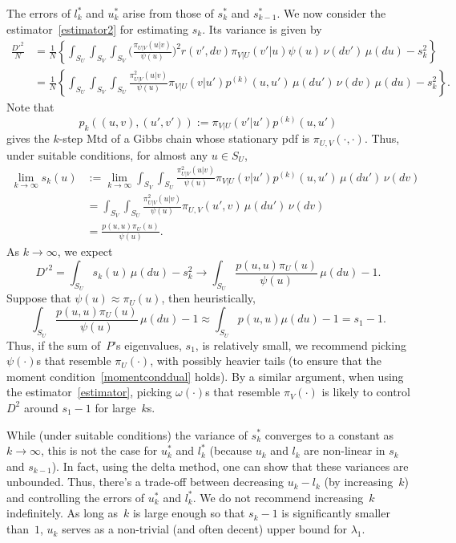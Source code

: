 \documentclass[11pt]{article}
\begin{document}
	The errors of $l^*_k$ and $u^*_k$ arise from those of $s^*_k$ and $s^*_{k-1}$. We now consider the estimator~\eqref{estimator2} for estimating $s_k$. Its variance is given by
	\[
	\begin{aligned}
	\frac{D'^2}{N} &= \frac{1}{N} \left\{ \int_{S_U}\int_{S_V}\int_{S_V} \bigg(\frac{\pi_{U|V}(u|v)}{\psi(u)}\bigg)^2
	r(v',dv) \pi_{V|U}(v'|u) \psi(u) \,\nu(dv') \, \mu(du) - s_k^2 \right\}\\
	&= \frac{1}{N} \left\{ \int_{S_U}\int_{S_V} \int_{S_U} \frac{\pi_{U|V}^2(u|v)}{\psi(u)} \pi_{V|U}(v|u') p^{(k)}(u,u') \, \mu(du') \, \nu(dv) \, \mu(du) - s_k^2 \right\}.
	\end{aligned}
	\]
	Note that
	\[
	p_k\left( (u,v), (u',v') \right) := \pi_{V|U}(v'|u') p^{(k)}(u,u')
	\]
	gives the $k$-step Mtd of a Gibbs chain whose stationary pdf is $\pi_{U,V}(\cdot,\cdot)$. Thus, under suitable conditions, for almost any $u \in S_U$,
	\[
	\begin{aligned}
	\lim\limits_{k \to \infty} s_k(u) &:= \lim\limits_{k \to \infty} \int_{S_V} \int_{S_U} \frac{\pi_{U|V}^2(u|v)}{\psi(u)} \pi_{V|U}(v|u') p^{(k)}(u,u') \, \mu(du') \, \nu(dv) \\
	&= \int_{S_V} \int_{S_U} \frac{\pi_{U|V}^2(u|v)}{\psi(u)} \pi_{U,V}(u',v) \, \mu(du') \, \nu(dv) \\
	&= \frac{p(u,u) \pi_U(u)}{\psi(u)}.
	\end{aligned}
	\]
	As $k \to \infty$, we expect
	\[
	D'^2 = \int_{S_U} s_k(u) \, \mu(du) - s_k^2 \to \int_{S_U} \frac{p(u,u) \pi_U(u)}{\psi(u)} \, \mu(du) - 1.
	\]
	Suppose that $\psi(u) \approx \pi_U(u)$, then heuristically,
	\[
	\int_{S_U} \frac{p(u,u) \pi_U(u)}{\psi(u)} \, \mu(du) - 1 \approx \int_{S_U} p(u,u) \mu(du) - 1 = s_1 - 1.
	\]
	Thus, if the sum of~$P$'s eigenvalues, $s_1$, is relatively small, we recommend picking $\psi(\cdot)$s that resemble $\pi_U(\cdot)$, with possibly heavier tails (to ensure that the moment condition~\eqref{momentconddual} holds). By a similar argument, when using the estimator~\eqref{estimator}, picking $\omega(\cdot)$s that resemble $\pi_V(\cdot)$ is likely to control $D^2$ around $s_1 - 1$ for large~$k$s.
	
	While (under suitable conditions) the variance of $s_k^*$ converges to a constant as $k \rightarrow \infty$, this is not the case for $u^*_k$ and $l^*_k$ (because $u_k$ and $l_k$ are non-linear in $s_k$ and $s_{k-1}$). In fact, using the delta method, one can show that these variances are unbounded. Thus, there's a trade-off between decreasing $u_k - l_k$ (by increasing~$k$) and controlling the errors of $u^*_k$ and $l^*_k$. We do not recommend increasing~$k$ indefinitely. As long as~$k$ is large enough so that $s_k - 1$ is significantly smaller than~$1$, $u_k$ serves as a non-trivial (and often decent) upper bound for $\lambda_1$.
	
\end{document}
